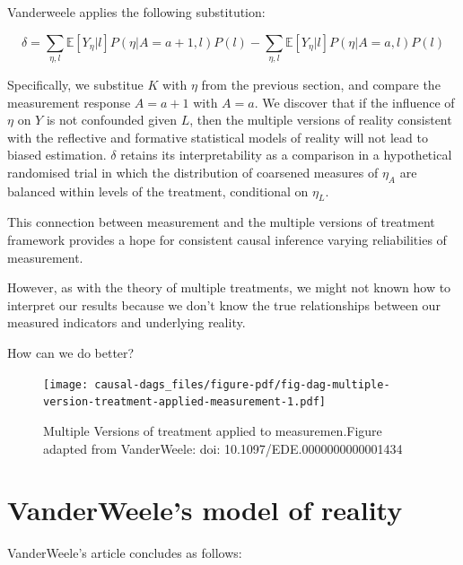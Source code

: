 \documentclass[
  singlecolumn]{report}
\begin{document}
Vanderweele applies the following substitution:

\[\delta = \sum_{\eta,l} \mathbb{E}[Y_\eta|l] P(\eta|A=a+1,l) P(l) - \sum_{\eta,l} \mathbb{E}[Y_\eta|l] P(\eta|A=a,l) P(l)\]

Specifically, we substitue \(K\) with \(\eta\) from the previous
section, and compare the measurement response \(A = a + 1\) with
\(A = a\). We discover that if the influence of \(\eta\) on \(Y\) is not
confounded given \(L\), then the multiple versions of reality consistent
with the reflective and formative statistical models of reality will not
lead to biased estimation. \(\delta\) retains its interpretability as a
comparison in a hypothetical randomised trial in which the distribution
of coarsened measures of \(\eta_A\) are balanced within levels of the
treatment, conditional on \(\eta_L\).

This connection between measurement and the multiple versions of
treatment framework provides a hope for consistent causal inference
varying reliabilities of measurement.

However, as with the theory of multiple treatments, we might not known
how to interpret our results because we don't know the true
relationships between our measured indicators and underlying reality.

How can we do better?

\begin{figure}

{\centering \texttt{[image: causal-dags\_files/figure-pdf/fig-dag-multiple-version-treatment-applied-measurement-1.pdf]}

}

\caption{\label{fig-dag-multiple-version-treatment-applied-measurement}Multiple
Versions of treatment applied to measuremen.Figure adapted from
VanderWeele: doi: 10.1097/EDE.0000000000001434}

\end{figure}

\hypertarget{vanderweeles-model-of-reality}{%
\section{VanderWeele's model of
reality}\label{vanderweeles-model-of-reality}}

VanderWeele's article concludes as follows:
\end{document}
